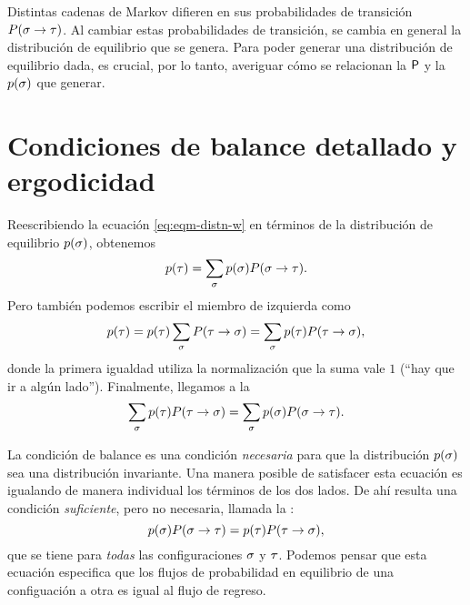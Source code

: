 Distintas cadenas de Markov difieren en sus probabilidades de transición $P(\ss \to \tt)$. Al cambiar estas probabilidades de transición, se cambia en general la distribución de equilibrio que se genera. Para poder generar una distribución de equilibrio dada, es crucial, por lo tanto, averiguar cómo se relacionan la $\PP$ y la $p(\ss)$ que generar.


\section{Condiciones de balance detallado y ergodicidad}

Reescribiendo la ecuación \eqref{eq:eqm-distn-w} en términos de la distribución de equilibrio $p(\ss)$, obtenemos
\begin{equation}
 p(\tau) = \sum_\ss p(\ss) P(\ss \to \tau).
\end{equation}
Pero también podemos escribir el miembro de izquierda como
\begin{equation}
  p(\tau) = p(\tau) \sum_\ss P(\tau \to \ss) = \sum_\ss p(\tau) P(\tau \to \ss),
\end{equation}
donde la primera igualdad utiliza la normalización que la suma vale $1$ (``hay que ir a algún lado'').
Finalmente, llegamos a la  
\begin{equation}
 \sum_\ss p(\tau) P(\tau \to \ss) = \sum_\ss p(\ss) P(\ss \to \tau).
\end{equation}

La condición de balance es una condición \emph{necesaria} para que la distribución $p(\ss)$ sea una distribución invariante.
Una manera posible de satisfacer esta ecuación es igualando de manera individual los términos de los dos lados. De ahí resulta una condición
\emph{suficiente}, pero no necesaria, llamada la :
\begin{equation}
p(\ss) P(\ss \to \tau) =  p(\tau) P(\tau \to \ss),
\label{eq:balance-detallado}
\end{equation}
que se tiene para \emph{todas} las configuraciones $\ss$ y $\tt$.
Podemos pensar que esta ecuación especifica que los flujos de probabilidad en equilibrio de una configuación a otra es igual al flujo de regreso.

